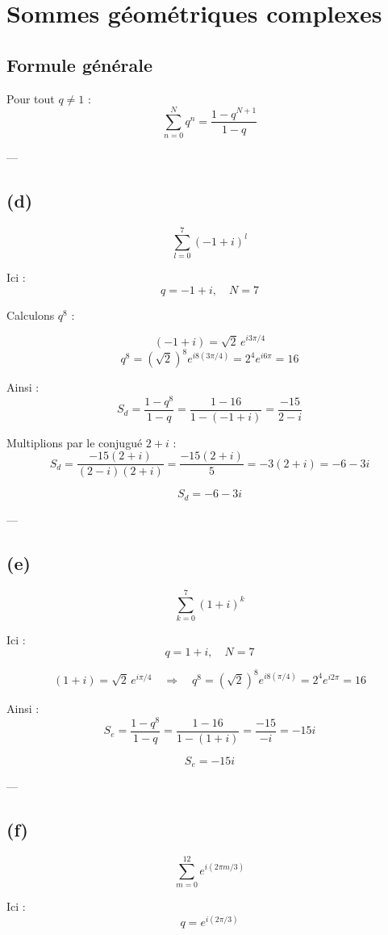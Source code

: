 \documentclass[a4paper,12pt]{article}
\begin{document}
\section*{Sommes géométriques complexes}

\subsection*{Formule générale}

Pour tout \( q \neq 1 \) :
\[
\sum_{n=0}^{N} q^n = \frac{1 - q^{N+1}}{1 - q}
\]

---

\subsection*{(d)}
\[
\sum_{l=0}^{7} (-1 + i)^l
\]

Ici :
\[
q = -1 + i, \quad N = 7
\]

Calculons \( q^8 \) :

\[
(-1 + i) = \sqrt{2}\, e^{i3\pi/4}
\]
\[
q^8 = (\sqrt{2})^8 e^{i8(3\pi/4)} = 2^4 e^{i6\pi} = 16
\]

Ainsi :
\[
S_d = \frac{1 - q^{8}}{1 - q} = \frac{1 - 16}{1 - (-1 + i)} = \frac{-15}{2 - i}
\]

Multiplions par le conjugué \(2 + i\) :
\[
S_d = \frac{-15(2 + i)}{(2 - i)(2 + i)} = \frac{-15(2 + i)}{5} = -3(2 + i) = -6 - 3i
\]

\[
\boxed{S_d = -6 - 3i}
\]

---

\subsection*{(e)}
\[
\sum_{k=0}^{7} (1 + i)^k
\]

Ici :
\[
q = 1 + i, \quad N = 7
\]

\[
(1 + i) = \sqrt{2}\, e^{i\pi/4} \quad \Rightarrow \quad q^8 = (\sqrt{2})^8 e^{i8(\pi/4)} = 2^4 e^{i2\pi} = 16
\]

Ainsi :
\[
S_e = \frac{1 - q^8}{1 - q} = \frac{1 - 16}{1 - (1 + i)} = \frac{-15}{-i} = -15i
\]

\[
\boxed{S_e = -15i}
\]

---

\subsection*{(f)}
\[
\sum_{m=0}^{12} e^{i(2\pi m / 3)}
\]

Ici :
\[
q = e^{i(2\pi/3)}
\]
\end{document}
